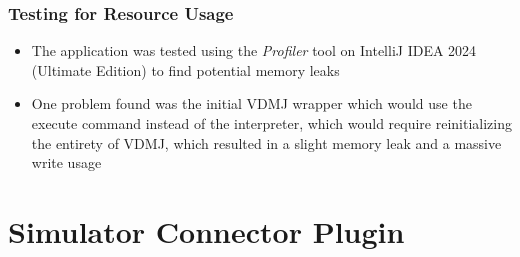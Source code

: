 \documentclass[../dissertation.tex]{subfiles}
\begin{document}
\subsubsection{Testing for Resource Usage}
\begin{itemize}
  \item The application was tested using the \textit{Profiler} tool on
    IntelliJ IDEA 2024 (Ultimate Edition) to find potential
    memory leaks
  \item One problem found was the initial VDMJ wrapper which would use the execute
    command instead of the interpreter, which would require reinitializing
    the entirety of VDMJ, which resulted in a slight memory leak and a
    massive write usage
\end{itemize}



\section{Simulator Connector Plugin}
\end{document}
